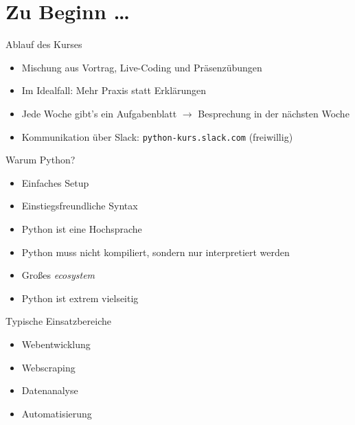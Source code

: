 \section{Zu Beginn \dots}

\begin{frame}
	\begin{block}{Ablauf des Kurses}
		\begin{itemize}
			\item Mischung aus Vortrag, Live-Coding und Präsenzübungen
			\item Im Idealfall: Mehr Praxis statt Erklärungen
			\item Jede Woche gibt's ein Aufgabenblatt $\rightarrow$ Besprechung in der nächsten Woche
			\item Kommunikation über Slack: \texttt{python-kurs.slack.com} (freiwillig)
		\end{itemize}
	\end{block}
\end{frame}

\begin{frame}
	\begin{block}{Warum Python?}
		\begin{itemize}
			\item Einfaches Setup
			\item Einstiegsfreundliche Syntax
			\item Python ist eine Hochsprache
			\item Python muss nicht kompiliert, sondern nur interpretiert werden
			\item Großes \textit{ecosystem}
			\item Python ist extrem vielseitig
		\end{itemize}
	\end{block}
\end{frame}

\begin{frame}
	\begin{block}{Typische Einsatzbereiche}
		\begin{itemize}
			\item Webentwicklung
			\item Webscraping
			\item Datenanalyse
			\item Automatisierung
		\end{itemize}
	\end{block}
\end{frame}



